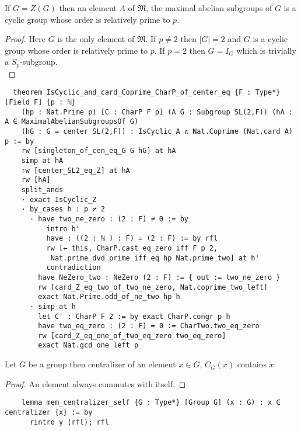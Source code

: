 \begin{lemma}
  \label{MaximalAbelianSubgroup.IsCyclic_and_card_Coprime_CharP_of_center_eq}
  \leanok
  If $G = Z(G)$ then an element $A$ of $\mathfrak{M}$, the maximal abelian subgroups of $G$ is a cyclic group whose order is relatively prime to $p$.
\end{lemma}
\begin{proof}
\leanok
  Here $G$ is the only element of $\mathfrak{M}$. If $p \neq 2$ then $|G|=2$ and $G$ is a cyclic group whose order is relatively prime to $p$. If $p=2$ then $G = I_G$ which is trivially a $S_p$-subgroup. \\
\end{proof}
\begin{footnotesize}
  \begin{verbatim}
  theorem IsCyclic_and_card_Coprime_CharP_of_center_eq {F : Type*} [Field F] {p : ℕ}
    (hp : Nat.Prime p) [C : CharP F p] (A G : Subgroup SL(2,F)) (hA : A ∈ MaximalAbelianSubgroupsOf G)
    (hG : G = center SL(2,F)) : IsCyclic A ∧ Nat.Coprime (Nat.card A) p := by
    rw [singleton_of_cen_eq_G G hG] at hA
    simp at hA
    rw [center_SL2_eq_Z] at hA
    rw [hA]
    split_ands
    · exact IsCyclic_Z
    · by_cases h : p ≠ 2
      · have two_ne_zero : (2 : F) ≠ 0 := by
          intro h'
          have : ((2 : ℕ ) : F) = (2 : F) := by rfl
          rw [← this, CharP.cast_eq_zero_iff F p 2,
           Nat.prime_dvd_prime_iff_eq hp Nat.prime_two] at h'
          contradiction
        have NeZero_two : NeZero (2 : F) := { out := two_ne_zero }
        rw [card_Z_eq_two_of_two_ne_zero, Nat.coprime_two_left]
        exact Nat.Prime.odd_of_ne_two hp h
      · simp at h
        let C' : CharP F 2 := by exact CharP.congr p h
        have two_eq_zero : (2 : F) = 0 := CharTwo.two_eq_zero
        rw [card_Z_eq_one_of_two_eq_zero two_eq_zero]
        exact Nat.gcd_one_left p
  \end{verbatim}
  \end{footnotesize}

\begin{corollary}
  \label{mem_centralizer_self}
  \leanok
 Let $G$ be a group then centralizer of an element $x \in G$, $C_G(x)$ contains $x$. 
\end{corollary}
\begin{proof}
  \leanok
  An element always commutes with itself.
\end{proof}
\begin{footnotesize}
  \begin{verbatim}
    lemma mem_centralizer_self {G : Type*} [Group G] (x : G) : x ∈ centralizer {x} := by
      rintro y ⟨rfl⟩; rfl
  \end{verbatim}
\end{footnotesize}

